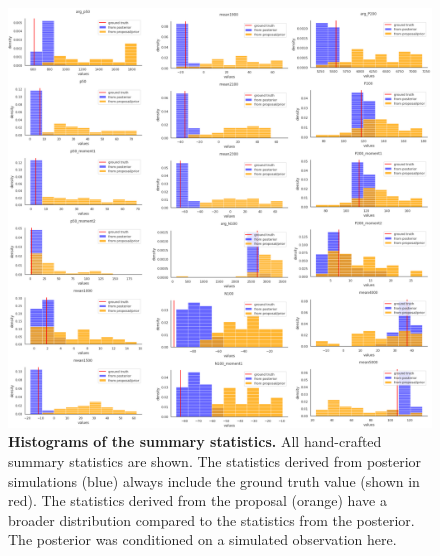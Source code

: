\documentclass[12pt]{extreport}
\begin{document}





\begin{figure}[h]
 \centering

        \includegraphics[width=0.99\linewidth]{images/all_histograms_appendix3.png}
        
        
\caption{\label{histo_appendix}\textbf{Histograms of the summary statistics.} \small All hand-crafted summary statistics are shown. The statistics derived from posterior simulations (blue) always include the ground truth value (shown in red). The statistics derived from the proposal (orange) have a broader distribution compared to the statistics from the posterior. The posterior was conditioned on a simulated observation here.}

\end{figure}
\end{document}
